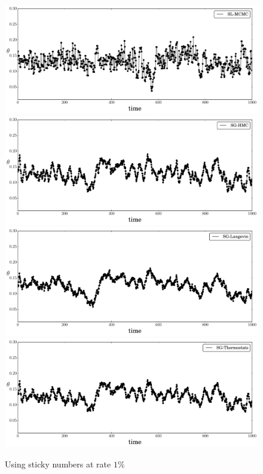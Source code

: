 \documentclass[]{article}
\begin{document}
\begin{figure}[t]
\setlength{\linewidth}{\textwidth}
\setlength{\hsize}{\textwidth}
\begin{center}
\includegraphics[width=0.95\columnwidth]{./images/exp-SL-MCMC-theta-timeseries-omega-rate-0p01-chain0.pdf}
\includegraphics[width=0.95\columnwidth]{./images/exp-SG-HMC-theta-timeseries-omega-rate-0p01-chain0.pdf}
\includegraphics[width=0.95\columnwidth]{./images/exp-SG-Langevin-theta-timeseries-omega-rate-0p01-chain0.pdf}
\includegraphics[width=0.95\columnwidth]{./images/exp-SG-Thermostats-theta-timeseries-omega-rate-0p01-chain0.pdf}
\caption{\small{Using sticky numbers at rate $1\%$}}
\label{fig:exp-theta-traces}
\end{center}
\vskip -0.2in
\end{figure} 
\end{document}
